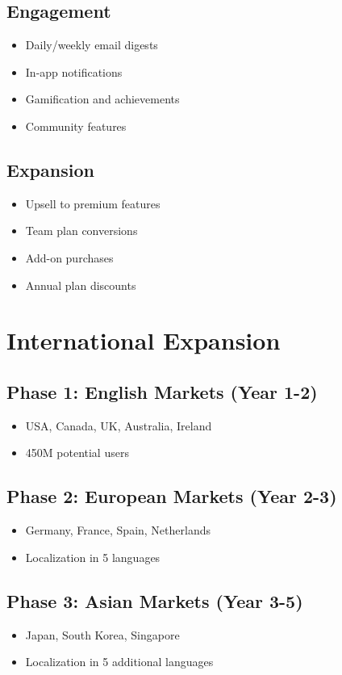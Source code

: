 \subsection{Engagement}
\begin{itemize}
    \item Daily/weekly email digests
    \item In-app notifications
    \item Gamification and achievements
    \item Community features
\end{itemize}

\subsection{Expansion}
\begin{itemize}
    \item Upsell to premium features
    \item Team plan conversions
    \item Add-on purchases
    \item Annual plan discounts
\end{itemize}

\section{International Expansion}

\subsection{Phase 1: English Markets (Year 1-2)}
\begin{itemize}
    \item USA, Canada, UK, Australia, Ireland
    \item 450M potential users
\end{itemize}

\subsection{Phase 2: European Markets (Year 2-3)}
\begin{itemize}
    \item Germany, France, Spain, Netherlands
    \item Localization in 5 languages
\end{itemize}

\subsection{Phase 3: Asian Markets (Year 3-5)}
\begin{itemize}
    \item Japan, South Korea, Singapore
    \item Localization in 5 additional languages
\end{itemize}

